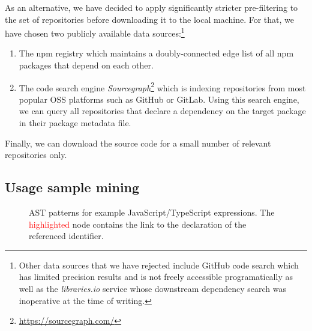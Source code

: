 As an alternative, we have decided to apply significantly stricter pre-filtering to the set of repositories before downloading it to the local machine.
For that, we have chosen two publicly available data sources:\footnote{
	Other data sources that we have rejected include GitHub code search which has limited precision results and is not freely accessible programatically as well as the \emph{libraries.io} service \citep{katz2020libraries} whose downstream dependency search was inoperative at the time of writing.%
}

\begin{enumerate}[label=(\roman*)]
	\item The npm registry which maintains a doubly-connected edge list of all npm packages that depend on each other.
	\item The code search engine \emph{Sourcegraph}\footnote{\url{https://sourcegraph.com/}} which is indexing repositories from most popular OSS platforms such as GitHub or GitLab.
		Using this search engine, we can query all repositories that declare a dependency on the target package in their package metadata file.
\end{enumerate}

Finally, we can download the source code for a small number of relevant repositories only.

\subsection{Usage sample mining}
\label{sec:approach/mining}

\begin{figure*}[htb!]
	\newcommand\lowlight[1]{\textcolor{gray}{#1}}
	\newcommand\highlight[1]{\textcolor{red}{#1}}
	\centering
	\begin{subfigure}[t]{.32\linewidth}
		
	\end{subfigure}
	\hfill
	\begin{subfigure}[t]{.32\linewidth}
		
	\end{subfigure}
	\hfill
	\begin{subfigure}[t]{.32\linewidth}
		
	\end{subfigure}

	\caption{AST patterns for example JavaScript/TypeScript expressions.
		The \highlight{highlighted} node contains the link to the declaration of the referenced identifier.
	}
	\label{fig:approach/mining/patterns}
\end{figure*}


